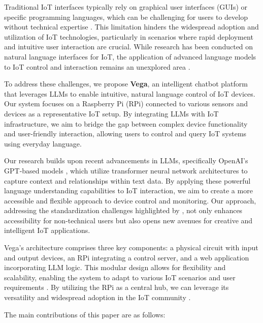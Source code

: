 \documentclass[lettersize,journal]{IEEEtran}
\begin{document}
Traditional IoT interfaces typically rely on graphical user interfaces (GUIs) or specific programming languages, which can be challenging for users to develop without technical expertise \cite{10.1145/3447526.3472036}. This limitation hinders the widespread adoption and utilization of IoT technologies, particularly in scenarios where rapid deployment and intuitive user interaction are crucial. While research has been conducted on natural language interfaces for IoT, the application of advanced language models to IoT control and interaction remains an unexplored area \cite{KASSAB2020102663}.

To address these challenges, we propose \textbf{Vega}, an intelligent chatbot platform that leverages LLMs to enable intuitive, natural language control of IoT devices. Our system focuses on a Raspberry Pi (RPi) connected to various sensors and devices as a representative IoT setup. By integrating LLMs with IoT infrastructure, we aim to bridge the gap between complex device functionality and user-friendly interaction, allowing users to control and query IoT systems using everyday language. 

Our research builds upon recent advancements in LLMs, specifically OpenAI's GPT-based models \cite{OpenAI_GPT}, which utilize transformer neural network architectures to capture context and relationships within text data. By applying these powerful language understanding capabilities to IoT interaction, we aim to create a more accessible and flexible approach to device control and monitoring. Our approach, addressing the standardization challenges highlighted by \citet{7821686}, not only enhances accessibility for non-technical users but also opens new avenues for creative and intelligent IoT applications.

Vega's architecture comprises three key components: a physical circuit with input and output devices, an RPi integrating a control server, and a web application incorporating LLM logic. This modular design allows for flexibility and scalability, enabling the system to adapt to various IoT scenarios and user requirements \cite{taylor2010software}. By utilizing the RPi as a central hub, we can leverage its versatility and widespread adoption in the IoT community \cite{8067944}. 

The main contributions of this paper are as follows:
\end{document}
